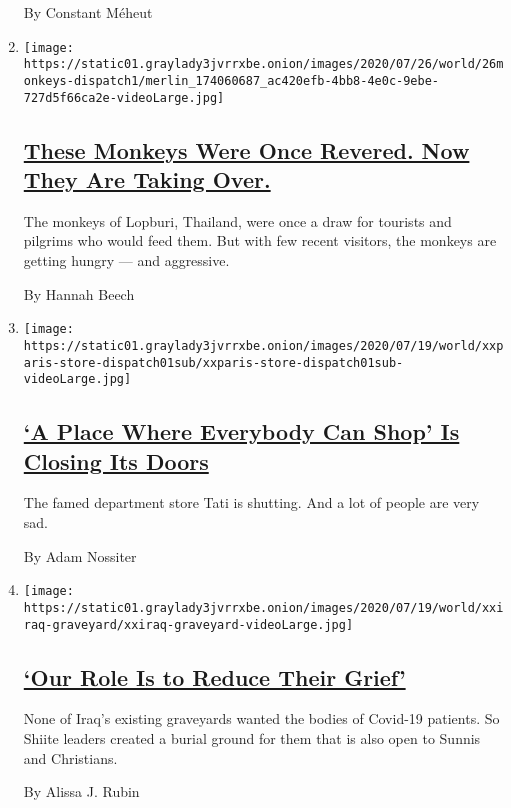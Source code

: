 \begin{enumerate}
  By Constant Méheut
\item
  \texttt{[image: https://static01.graylady3jvrrxbe.onion/images/2020/07/26/world/26monkeys-dispatch1/merlin\_174060687\_ac420efb-4bb8-4e0c-9ebe-727d5f66ca2e-videoLarge.jpg]}

  \hypertarget{these-monkeys-were-once-revered-now-they-are-taking-over}{%
  \subsection{\texorpdfstring{\href{/2020/07/25/world/asia/thailand-monkeys.html}{These
  Monkeys Were Once Revered. Now They Are Taking
  Over.}}{These Monkeys Were Once Revered. Now They Are Taking Over.}}\label{these-monkeys-were-once-revered-now-they-are-taking-over}}

  The monkeys of Lopburi, Thailand, were once a draw for tourists and
  pilgrims who would feed them. But with few recent visitors, the
  monkeys are getting hungry --- and aggressive.

  By Hannah Beech
\item
  \texttt{[image: https://static01.graylady3jvrrxbe.onion/images/2020/07/19/world/xxparis-store-dispatch01sub/xxparis-store-dispatch01sub-videoLarge.jpg]}

  \hypertarget{a-place-where-everybody-can-shop-is-closing-its-doors}{%
  \subsection{\texorpdfstring{\href{/2020/07/20/world/europe/france-paris-tati-coronavirus.html}{`A
  Place Where Everybody Can Shop' Is Closing Its
  Doors}}{`A Place Where Everybody Can Shop' Is Closing Its Doors}}\label{a-place-where-everybody-can-shop-is-closing-its-doors}}

  The famed department store Tati is shutting. And a lot of people are
  very sad.

  By Adam Nossiter
\item
  \texttt{[image: https://static01.graylady3jvrrxbe.onion/images/2020/07/19/world/xxiraq-graveyard/xxiraq-graveyard-videoLarge.jpg]}

  \hypertarget{our-role-is-to-reduce-their-grief}{%
  \subsection{\texorpdfstring{\href{/2020/07/18/world/middleeast/iraq-coronovirus-cemetery.html}{`Our
  Role Is to Reduce Their
  Grief'}}{`Our Role Is to Reduce Their Grief'}}\label{our-role-is-to-reduce-their-grief}}

  None of Iraq's existing graveyards wanted the bodies of Covid-19
  patients. So Shiite leaders created a burial ground for them that is
  also open to Sunnis and Christians.

  By Alissa J. Rubin
\end{enumerate}

